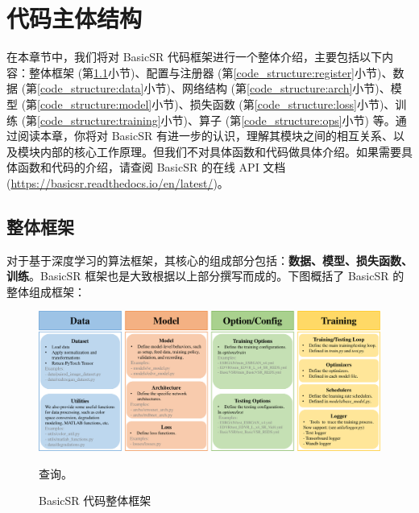\documentclass[../main.tex]{subfiles}
\begin{document}
\chapter{代码主体结构}
\vspace{-2cm}

在本章节中，我们将对 BasicSR 代码框架进行一个整体介绍，主要包括以下内容：整体框架 (第\ref{code_structure:overview}小节)、配置与注册器 (第\ref{code_structure:register}小节)、数据 (第\ref{code_structure:data}小节)、网络结构 (第\ref{code_structure:arch}小节)、模型 (第\ref{code_structure:model}小节)、损失函数 (第\ref{code_structure:loss}小节)、训练 (第\ref{code_structure:training}小节)、算子 (第\ref{code_structure:ops}小节) 等。通过阅读本章，你将对 BasicSR 有进一步的认识，理解其模块之间的相互关系、以及模块内部的核心工作原理。但我们不对具体函数和代码做具体介绍。如果需要具体函数和代码的介绍，请查阅 BasicSR 的在线 API 文档 (\url{https://basicsr.readthedocs.io/en/latest/})。

\section{整体框架} \label{code_structure:overview}
对于基于深度学习的算法框架，其核心的组成部分包括：\textbf{数据、模型、损失函数、训练}。BasicSR 框架也是大致根据以上部分撰写而成的。下图概括了 BasicSR 的整体组成框架：

\begin{figure}[htbp]
    \begin{center}
        \includegraphics[width=1\linewidth]{figures/main_framework.pdf}
    \end{center}
    \caption{BasicSR 代码整体框架 }
    \label{fig:main_framework}查询。
\end{figure}
\end{document}
